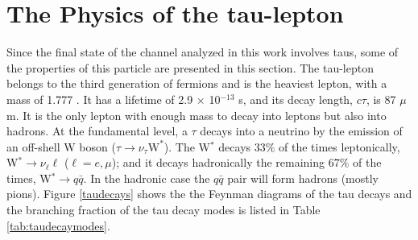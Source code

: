 \section{The Physics of the tau-lepton}
\label{sec:Taus}

\noindent Since the final state of the channel analyzed in this work involves 
taus, some of the properties of this particle are presented 
in this section. The tau-lepton belongs to the third generation of fermions and is the 
heaviest lepton, with a mass of 1.777 \GeV. It has a lifetime of 2.9 $\times$ 10$^{-13}$ s, and its 
decay length, $c\tau$, is 87 $\mu$m. It is the only lepton with enough mass 
to decay into leptons but also into hadrons. At the fundamental 
level, a $\tau$ decays into a neutrino by the emission of an off-shell 
W boson ($\tau \rightarrow \nu_{\tau} \text{W}^*$). The W$^*$ decays $33\%$ of the times
leptonically, W$^* \rightarrow \nu_{\ell} \ell$ ($\ell = e,\mu$); and it decays 
hadronically the remaining $67\%$ of the times, W$^* \rightarrow q \bar{q}$. 
In the hadronic case the $q\bar{q}$ pair will form hadrons (mostly pions). Figure \ref{taudecays} shows the 
the Feynman diagrams of the tau decays and the branching fraction of the tau decay modes is 
listed  in Table \ref{tab:taudecaymodes}. \\





